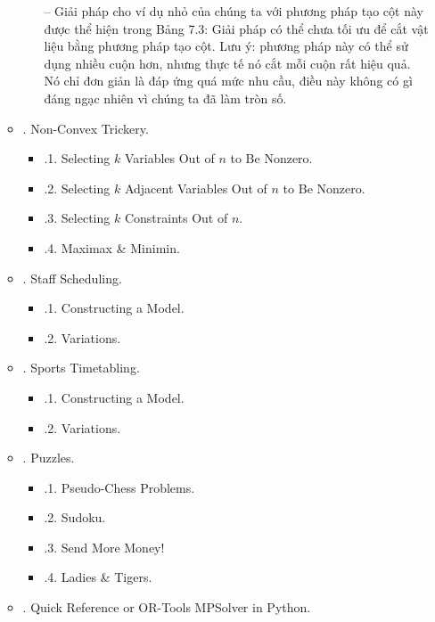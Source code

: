 \documentclass{article}
\begin{document}
\begin{itemize}
\begin{itemize}
\begin{itemize}
            -- Giải pháp cho ví dụ nhỏ của chúng ta với phương pháp tạo cột này được thể hiện trong {\sf Bảng 7.3: Giải pháp có thể chưa tối ưu để cắt vật liệu bằng phương pháp tạo cột}. Lưu ý: phương pháp này có thể sử dụng nhiều cuộn hơn, nhưng thực tế nó cắt mỗi cuộn rất hiệu quả. Nó chỉ đơn giản là đáp ứng quá mức nhu cầu, điều này không có gì đáng ngạc nhiên vì chúng ta đã làm tròn số.
        \end{itemize}
        \item {. Non-Convex Trickery.}
        \begin{itemize}
            \item {.1. Selecting $k$ Variables Out of $n$ to Be Nonzero.}
            \item {.2. Selecting $k$ Adjacent Variables Out of $n$ to Be Nonzero.}
            \item {.3. Selecting $k$ Constraints Out of $n$.}
            \item {.4. Maximax \& Minimin.}
        \end{itemize}
        \item {. Staff Scheduling.}
        \begin{itemize}
            \item {.1. Constructing a Model.}
            \item {.2. Variations.}
        \end{itemize}
        \item {. Sports Timetabling.}
        \begin{itemize}
            \item {.1. Constructing a Model.}
            \item {.2. Variations.}
        \end{itemize}
        \item {. Puzzles.}
        \begin{itemize}
            \item {.1. Pseudo-Chess Problems.}
            \item {.2. Sudoku.}
            \item {.3. Send More Money!}
            \item {.4. Ladies \& Tigers.}
        \end{itemize}
        \item {. Quick Reference or OR-Tools MPSolver in Python.}
    \end{itemize}
\end{itemize}
\end{document}
